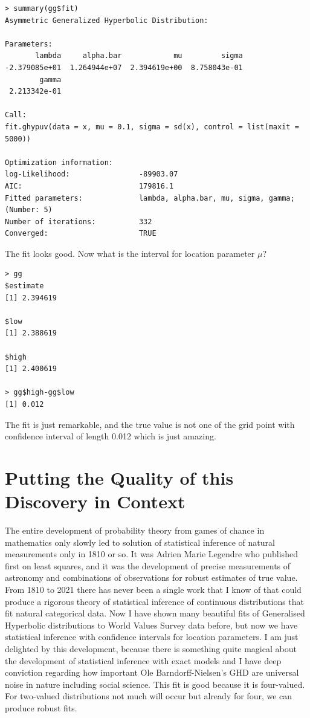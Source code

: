 \documentclass{amsart}
\begin{document}
\begin{verbatim}
> summary(gg$fit)
Asymmetric Generalized Hyperbolic Distribution:

Parameters:
       lambda     alpha.bar            mu         sigma 
-2.379085e+01  1.264944e+07  2.394619e+00  8.758043e-01 
        gamma 
 2.213342e-01 

Call:
fit.ghypuv(data = x, mu = 0.1, sigma = sd(x), control = list(maxit = 5000))

Optimization information:
log-Likelihood:                -89903.07 
AIC:                           179816.1 
Fitted parameters:             lambda, alpha.bar, mu, sigma, gamma;  (Number: 5)
Number of iterations:          332 
Converged:                     TRUE 
\end{verbatim}

The fit looks good.  Now what is the interval for location parameter $\mu$?

\begin{verbatim}
> gg
$estimate
[1] 2.394619

$low
[1] 2.388619

$high
[1] 2.400619

> gg$high-gg$low
[1] 0.012
\end{verbatim}

The fit is just remarkable, and the true value is not one of the grid point with confidence interval of length 0.012 which is just amazing.

\section{Putting the Quality of this Discovery in Context}

The entire development of probability theory from games of chance in mathematics only slowly led to solution of statistical inference of natural measurements only in 1810 or so.  It was Adrien Marie Legendre who published first on least squares, and it was the development of precise measurements of astronomy and combinations of observations for robust estimates of true value.  From 1810 to 2021 there has never been a single work that I know of that could produce a rigorous theory of statistical inference of continuous distributions that fit natural categorical data.  Now I have shown many beautiful fits of Generalised Hyperbolic distributions to World Values Survey data before, but now we have statistical inference with confidence intervals for location parameters.  I am just delighted by this development, because there is something quite magical about the development of statistical inference with exact models and I have deep conviction regarding how important Ole Barndorff-Nielsen's GHD are universal noise in nature including social science.  This fit is good because it is four-valued.  For two-valued distributions not much will occur but already for four, we can produce robust fits.
\end{document}
